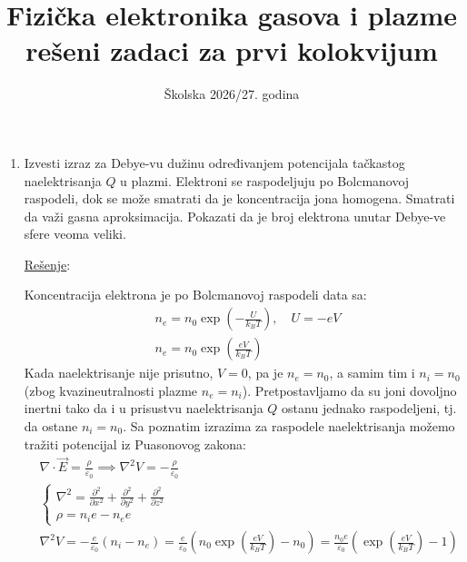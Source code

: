 \documentclass[fleqn]{report}
\title{
    Fizička elektronika gasova i plazme \\
    \large rešeni zadaci za prvi kolokvijum
}
\author{}
\date{Školska 2026/27. godina}
\begin{document}
\maketitle

\begin{enumerate}
    \item Izvesti izraz za Debye-vu dužinu određivanjem potencijala tačkastog naelektrisanja $Q$ u plazmi.
          Elektroni se raspodeljuju po Bolcmanovoj raspodeli, dok se može smatrati da je koncentracija jona homogena.
          Smatrati da važi gasna aproksimacija.
          Pokazati da je broj elektrona unutar Debye-ve sfere veoma veliki.

          \underline{Rešenje}:

          Koncentracija elektrona je po Bolcmanovoj raspodeli data sa:
          \begin{align*}
               & n_e = n_0 \exp\left(-\frac{U}{k_B T}\right), \quad U = -eV \\
               & n_e = n_0 \exp\left(\frac{eV}{k_B T}\right)
          \end{align*}
          Kada naelektrisanje nije prisutno, $V = 0$, pa je $n_e = n_0$, a samim tim i $n_i = n_0$ (zbog kvazineutralnosti plazme $n_e = n_i$).
          Pretpostavljamo da su joni dovoljno inertni tako da i u prisustvu naelektrisanja $Q$ ostanu jednako raspodeljeni, tj. da ostane $n_i = n_0$.
          Sa poznatim izrazima za raspodele naelektrisanja možemo tražiti potencijal iz Puasonovog zakona:
          \begin{align*}
               & \nabla \cdot \vec E = \frac{\rho}{\varepsilon_0} \implies \nabla^2 V = -\frac{\rho}{\varepsilon_0}                                                                                                                   \\
               & \begin{cases}
                     \nabla^2 = \frac{\partial^2}{\partial x^2} + \frac{\partial^2}{\partial y^2} + \frac{\partial^2}{\partial z^2} \\
                     \rho = n_i e - n_e e
                 \end{cases}                                                                                                   \\
               & \nabla^2 V = -\frac{e}{\varepsilon_0} (n_i - n_e) = \frac{e}{\varepsilon_0} \left(n_0\exp\left(\frac{eV}{k_B T}\right) - n_0\right) = \frac{n_0 e}{\varepsilon_0} \left(\exp\left(\frac{eV}{k_B T}\right) - 1\right)

\end{align*}
\end{enumerate}
\end{document}
